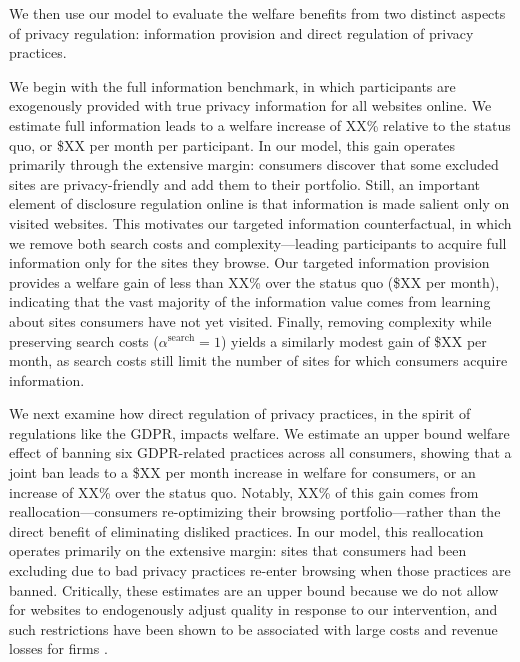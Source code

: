 \documentclass[12pt]{article}
\theoremstyle{definition}
\theoremstyle{remark}
\begin{document}
We then use our model to evaluate the welfare benefits from two distinct aspects of privacy regulation: information provision and direct regulation of privacy practices.

We begin with the full information benchmark, in which participants are exogenously provided with true privacy information for all websites online. We estimate full information leads to a welfare increase of XX\% relative to the status quo, or \$XX per month per participant. %
In our model, this gain operates primarily through the extensive margin: consumers discover that some excluded sites are privacy-friendly and add them to their portfolio. Still, an important element of disclosure regulation online is that information is made salient only on visited websites. This motivates our targeted information counterfactual, in which we remove both search costs and complexity---leading participants to acquire full information only for the sites they browse. Our targeted information provision provides a welfare gain of less than XX\% over the status quo (\$XX per month), indicating that the vast majority of the information value comes from learning about sites consumers have not yet visited. %
Finally, removing complexity while preserving search costs ($\alpha^{\text{search}} = 1$) yields a similarly modest gain of \$XX per month, as search costs still limit the number of sites for which consumers acquire information. %

We next examine how direct regulation of privacy practices, in the spirit of regulations like the GDPR, impacts welfare. We estimate an upper bound welfare effect of banning six GDPR-related practices across all consumers, showing that a joint ban leads to a \$XX per month increase in welfare for consumers, or an increase of XX\% over the status quo. %
Notably, XX\% of this gain comes from reallocation---consumers re-optimizing their browsing portfolio---rather than the direct benefit of eliminating disliked practices. %
In our model, this reallocation operates primarily on the extensive margin: sites that consumers had been excluding due to bad privacy practices re-enter browsing when those practices are banned. Critically, these estimates are an upper bound because we do not allow for websites to endogenously adjust quality in response to our intervention, and such restrictions have been shown to be associated with large costs and revenue losses for firms \citep{goldberg2023regulating, aridor2023effect, aridor2024privacy}.
\end{document}
